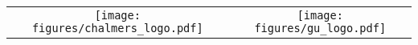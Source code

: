 \documentclass[10pt,a4paper,onecolumn,english]{book}
\begin{document}
\vfill

\begin{center}
\begin{tabular}[h]{ c c }
  \vspace{0pt}\texttt{[image: figures/chalmers\_logo.pdf]}
  &
  \vspace{0pt}\texttt{[image: figures/gu\_logo.pdf]}
\end{tabular}
\end{center}


\newpage
\thispagestyle{empty}


\end{document}
